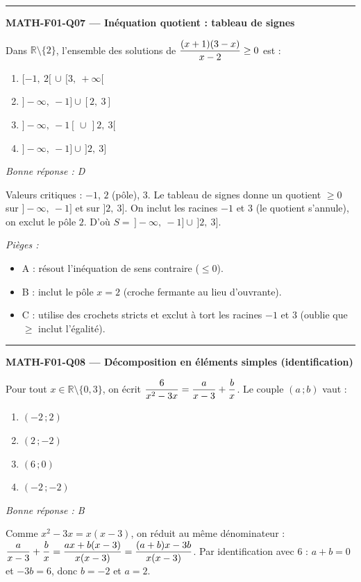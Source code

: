 \documentclass[11pt,a4paper]{article}
\newcommand{\R}{\mathbb{R}}\newcommand{\N}{\mathbb{N}}\newcommand{\Z}{\mathbb{Z}}
\begin{document}
\vspace{8pt}\hrule\vspace{8pt}
\noindent\textbf{MATH-F01-Q07 --- Inéquation quotient : tableau de signes}\par
Dans $\R\setminus\{2\}$, l'ensemble des solutions de $\displaystyle\frac{(x+1)(3-x)}{x-2}\ge 0$ est :
\begin{enumerate}[label=\Alph*)]
\item $[-1,\ 2[\,\cup\,[3,\ +\infty[$
\item $]-\infty,\ -1]\cup[2,\ 3]$
\item $]-\infty,\ -1[\,\cup\,]2,\ 3[$
\item $]-\infty,\ -1]\cup\,]2,\ 3]$
\end{enumerate}
\textit{Bonne réponse : D}\par
Valeurs critiques : $-1$, $2$ (p\^ole), $3$. Le tableau de signes donne un quotient $\ge 0$ sur $]-\infty,\ -1]$ et sur $]2,\ 3]$. On inclut les racines $-1$ et $3$ (le quotient s'annule), on exclut le p\^ole $2$. D'o\`u $S=\,]-\infty,\ -1]\cup\,]2,\ 3]$.\par
\textit{Pièges :}
\begin{itemize}
\item A : r\'esout l'in\'equation de sens contraire ($\le 0$).
\item B : inclut le p\^ole $x=2$ (croche fermante au lieu d'ouvrante).
\item C : utilise des crochets stricts et exclut \`a tort les racines $-1$ et $3$ (oublie que $\ge$ inclut l'\'egalit\'e).
\end{itemize}
\vspace{8pt}\hrule\vspace{8pt}
\noindent\textbf{MATH-F01-Q08 --- Décomposition en éléments simples (identification)}\par
Pour tout $x\in\R\setminus\{0,3\}$, on \'ecrit $\displaystyle\frac{6}{x^{2}-3x}=\frac{a}{x-3}+\frac{b}{x}$. Le couple $(a\,;b)$ vaut :
\begin{enumerate}[label=\Alph*)]
\item $(-2\,;2)$
\item $(2\,;-2)$
\item $(6\,;0)$
\item $(-2\,;-2)$
\end{enumerate}
\textit{Bonne réponse : B}\par
Comme $x^{2}-3x=x(x-3)$, on r\'eduit au m\^eme d\'enominateur : $\displaystyle\frac{a}{x-3}+\frac{b}{x}=\frac{ax+b(x-3)}{x(x-3)}=\frac{(a+b)x-3b}{x(x-3)}$. Par identification avec $6$ : $a+b=0$ et $-3b=6$, donc $b=-2$ et $a=2$.\par
\end{document}

